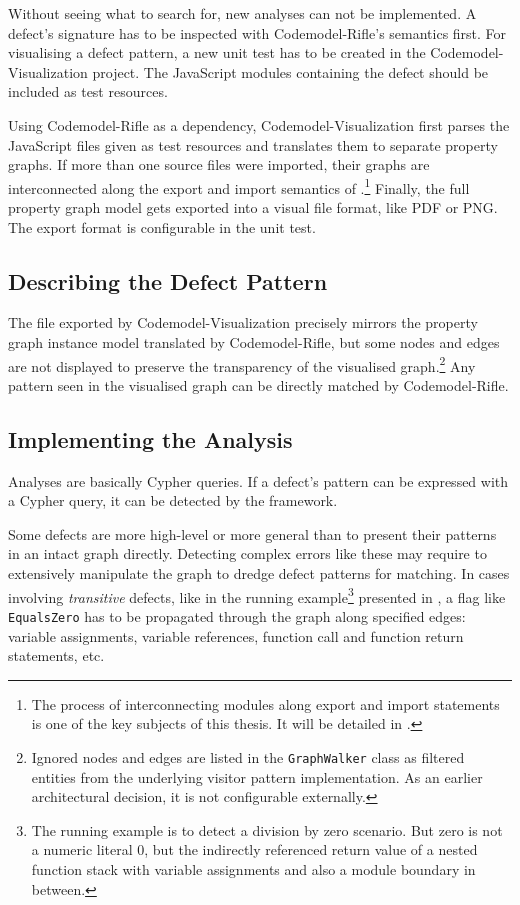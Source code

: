 Without seeing what to search for, new analyses can not be implemented. A defect's signature has to be inspected with Codemodel-Rifle's semantics first. For visualising a defect pattern, a new unit test has to be created in the Codemodel-Visualization project. The JavaScript modules containing the defect should be included as test resources.

Using Codemodel-Rifle as a dependency, Codemodel-Visualization first parses the JavaScript files given as test resources and translates them to separate property graphs. If more than one source files were imported, their graphs are interconnected along the export and import semantics of \es.\footnote{The process of interconnecting \es modules along export and import statements is one of the key subjects of this thesis. It will be detailed in .} Finally, the full property graph model gets exported into a visual file format, like PDF or PNG. The export format is configurable in the unit test.


\subsection{Describing the Defect Pattern}

The file exported by Codemodel-Visualization precisely mirrors the property graph instance model translated by Codemodel-Rifle, but some nodes and edges are not displayed to preserve the transparency of the visualised graph.\footnote{Ignored nodes and edges are listed in the \lstinline{GraphWalker} class as filtered entities from the underlying visitor pattern implementation. As an earlier architectural decision, it is not configurable externally.} Any pattern seen in the visualised graph can be directly matched by Codemodel-Rifle.


\subsection{Implementing the Analysis}
\label{subsection:implementing-analyses}

Analyses are basically Cypher queries. If a defect's pattern can be expressed with a Cypher query, it can be detected by the framework.

Some defects are more high-level or more general than to present their patterns in an intact graph directly. Detecting complex errors like these may require to extensively manipulate the graph to dredge defect patterns for matching. In cases involving \emph{transitive} defects, like in the running example\footnote{The running example is to detect a division by zero scenario. But zero is not a numeric literal $0$, but the indirectly referenced return value of a nested function stack with variable assignments and also a module boundary in between.} presented in , a flag like \lstinline{EqualsZero} has to be propagated through the graph along specified edges: variable assignments, variable references, function call and function return statements, etc.

